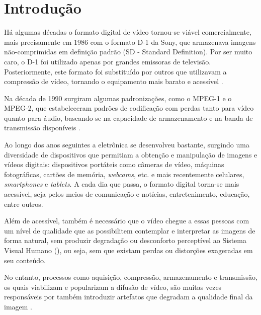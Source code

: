 
\chapter{Introdução}





Há algumas décadas o formato digital de vídeo tornou-se viável comercialmente, mais precisamente em 1986 com o formato D-1 da Sony, que armazenava imagens não-comprimidas em definição padrão (SD - Standard Definition). Por ser muito caro, o D-1 foi utilizado apenas por grandes emissoras de televisão. Posteriormente, este formato foi substituído por outros que utilizavam a compressão de vídeo, tornando o equipamento mais barato e acessível \cite{wikidigitalvideo}.

Na década de 1990 surgiram algumas padronizações, como o MPEG-1 e o MPEG-2, que estabeleceram padrões de codificação com perdas tanto para vídeo quanto para áudio, baseando-se na capacidade de armazenamento e na banda de transmissão disponíveis \cite{mpeg2ref}.

Ao longo dos anos seguintes a eletrônica se desenvolveu bastante, surgindo uma diversidade de dispositivos que permitiam a obtenção e manipulação de imagens e vídeos digitais: dispositivos portáteis como câmeras de vídeo, máquinas fotográficas, cartões de memória, \emph{webcams}, etc. e mais recentemente celulares, \emph{smartphones} e \emph{tablets}. A cada dia que passa, o formato digital torna-se mais acessível, seja pelos meios de comunicação e notícias, entretenimento, educação, entre outros.

Além de acessível, também é necessário que o vídeo chegue a essas pessoas com um nível de qualidade que as possibilitem contemplar e interpretar as imagens de forma natural, sem produzir degradação ou desconforto perceptível ao Sistema Visual Humano (), ou seja, sem que existam perdas ou distorções exageradas em seu conteúdo.

No entanto, processos como aquisição, compressão, armazenamento e transmissão, os quais viabilizam e popularizam a difusão de vídeo, são muitas vezes responsáveis por também introduzir artefatos que degradam a qualidade final da imagem \cite{daronco, wangbovik2004}.

